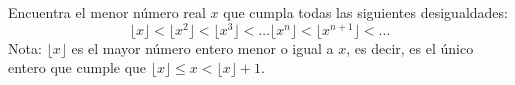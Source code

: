 Encuentra el menor número real $x$ que cumpla todas las siguientes desigualdades:
\[\lfloor x \rfloor < \lfloor x^2 \rfloor < \lfloor x^3 \rfloor < \dots \lfloor x^n \rfloor < \lfloor x^{n+1} \rfloor < \dots\]
Nota: $\lfloor x \rfloor$ es el mayor número entero menor o igual a $x$, es decir, es el único entero que cumple que $\lfloor x \rfloor \leq x < \lfloor x \rfloor +1$.
